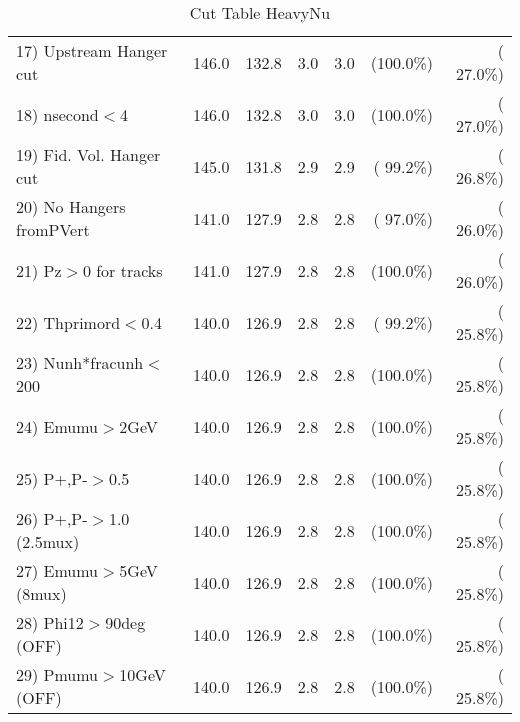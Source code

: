 \begin{table}[h!]
\begin{tabular}{||l||r|r|r|r|r|r||}
 17) Upstream Hanger cut  &        146.0 &        132.8 &          3.0 &          3.0 & (100.0\%) & ( 27.0\%) \\
 18) nsecond$<$4          &        146.0 &        132.8 &          3.0 &          3.0 & (100.0\%) & ( 27.0\%) \\
 19) Fid. Vol. Hanger cut &        145.0 &        131.8 &          2.9 &          2.9 & ( 99.2\%) & ( 26.8\%) \\
 20) No Hangers fromPVert &        141.0 &        127.9 &          2.8 &          2.8 & ( 97.0\%) & ( 26.0\%) \\
 21) Pz$>$0 for tracks    &        141.0 &        127.9 &          2.8 &          2.8 & (100.0\%) & ( 26.0\%) \\
 22) Thprimord$<$0.4      &        140.0 &        126.9 &          2.8 &          2.8 & ( 99.2\%) & ( 25.8\%) \\
 23) Nunh*fracunh$<$200   &        140.0 &        126.9 &          2.8 &          2.8 & (100.0\%) & ( 25.8\%) \\
 24) Emumu$>$2GeV         &        140.0 &        126.9 &          2.8 &          2.8 & (100.0\%) & ( 25.8\%) \\
 25) P+,P-$>$0.5          &        140.0 &        126.9 &          2.8 &          2.8 & (100.0\%) & ( 25.8\%) \\
 26) P+,P-$>$1.0 (2.5mux) &        140.0 &        126.9 &          2.8 &          2.8 & (100.0\%) & ( 25.8\%) \\
 27) Emumu$>$5GeV  (8mux) &        140.0 &        126.9 &          2.8 &          2.8 & (100.0\%) & ( 25.8\%) \\
 28) Phi12$>$90deg  (OFF) &        140.0 &        126.9 &          2.8 &          2.8 & (100.0\%) & ( 25.8\%) \\
 29) Pmumu$>$10GeV  (OFF) &        140.0 &        126.9 &          2.8 &          2.8 & (100.0\%) & ( 25.8\%) \\
 \hline
 \hline
 \end{tabular}
 \caption{Cut Table  HeavyNu  }
 \label{tab-cutheavy_neutrino}
 \end{table}
